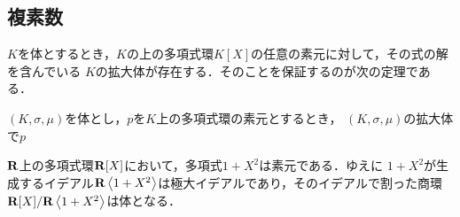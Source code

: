 \subsection{複素数}
	$K$を体とするとき，$K$の上の多項式環$K[X]$の任意の素元に対して，その式の解を含んでいる
	$K$の拡大体が存在する．そのことを保証するのが次の定理である．
	
	\begin{screen}
		\begin{thm}[単拡大]
			$(K,\sigma,\mu)$を体とし，$p$を$K$上の多項式環の素元とするとき，
			$(K,\sigma,\mu)$の拡大体で$p$
		\end{thm}
	\end{screen}
	
	$\mathbf{R}$上の多項式環$\mathbf{R}[X]$において，多項式$1 + X^2$は素元である．ゆえに
	$1+X^2$が生成するイデアル$\R\inprod<1+X^2>$は極大イデアルであり，そのイデアルで割った商環
	$\R[X]/\R\inprod<1+X^2>$は体となる．
	